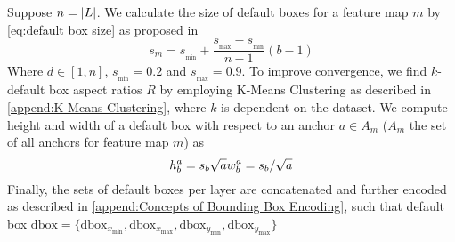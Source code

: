 \label{verysubsect:Default box size and aspect ratio}
Suppose \(n=\abs{L}\). We calculate the size of default boxes for a feature map
\(m\) by \autoref{eq:default box size} as proposed in \cite{Liu.2016}
\begin{equation}
    s_m=s_{_\text{min}} + \frac{s_{_\text{max}}-s_{_\text{min}}}{n-1}(b-1)
\end{equation}\label{eq:default box size}
Where \(d\in [1, n]\), \(s_{_\text{min}}=0.2\) and \(s_{_\text{max}}=0.9\). To improve 
convergence, we find \(k\)-default box aspect ratios \(R\) by employing K-Means 
Clustering as described in \autoref{append:K-Means Clustering}, where \(k\) is 
dependent on the dataset. We compute 
height and width of a default box with respect to an anchor \(a\in A_m\) (\(A_m\)
the set of all anchors for feature map \(m\)) as
\begin{equation}
    h_b^a=s_b\sqrt{a}\\
    w_b^a=s_b/\sqrt{a}
\end{equation}
Finally, the sets of default boxes per \gls{layer} are concatenated and further
encoded as described in \autoref{append:Concepts of Bounding Box Encoding}, such
that default box
\(\text{dbox} = \{\text{dbox}_{x_\text{min}}, \text{dbox}_{x_\text{max}}, \text{dbox}_{y_\text{min}}, \text{dbox}_{y_\text{max}}\}\)


